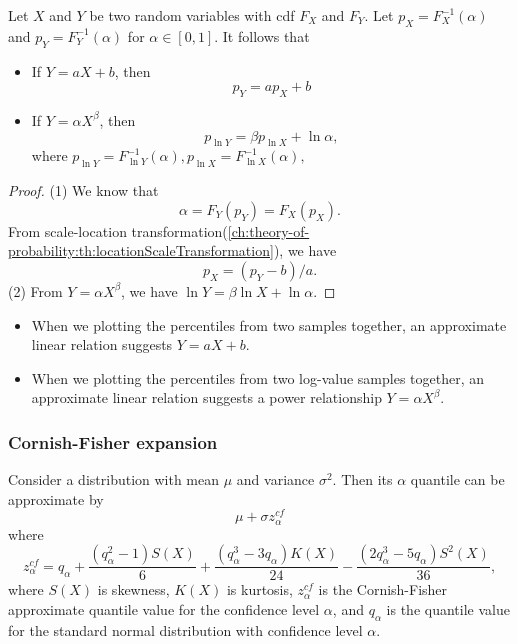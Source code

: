 \begin{refsection}
\begin{lemma}
Let $X$ and $Y$ be two random variables with cdf $F_X$ and $F_Y$. Let $p_X = F_X^{-1}(\alpha)$ and $p_Y = F_Y^{-1}(\alpha)$ for $\alpha\in [0,1]$. It follows that
\begin{itemize}
	\item If $Y = aX + b$, then 
	$$p_Y = ap_X + b$$
	\item If $Y = \alpha X^\beta$, then
	$$p_{\ln Y} = \beta p_{\ln X} + \ln \alpha,$$
	where $p_{\ln Y} = F^{-1}_{\ln Y}(\alpha),p_{\ln X} = F^{-1}_{\ln X}(\alpha),$
\end{itemize}
\end{lemma}
\begin{proof}
(1)	We know that
$$\alpha = F_Y(p_Y) = F_X(p_X).$$
From scale-location transformation(\autoref{ch:theory-of-probability:th:locationScaleTransformation}), we have 
$$p_X = (p_Y-b)/a.$$
(2) From $Y = \alpha X^\beta$, we have $\ln Y = \beta\ln X + \ln \alpha.$
\end{proof}

\begin{remark} \hfill
\begin{itemize}
	\item When we plotting the percentiles from two samples together, an approximate linear relation suggests $Y = aX + b$.
	\item When we plotting the percentiles from two log-value samples  together, an approximate linear relation suggests a power relationship $Y = \alpha X^\beta$.
\end{itemize}	
	
\end{remark}


\subsubsection{Cornish-Fisher expansion}



\begin{theorem}\label{ch:theory-of-statistics:th:CornishFisherExpansion}
Consider a distribution with mean $\mu$ and variance $\sigma^2$. Then its $\alpha$ quantile can be approximate by
$$\mu + \sigma z^{cf}_\alpha$$
where	
	$$z^{cf}_\alpha = q_\alpha + \frac{(q_\alpha^2 - 1)S(X)}{6} + \frac{(q_\alpha^3 - 3q_\alpha)K(X)}{24} - \frac{(2q_\alpha^3 - 5q_\alpha)S^2(X)}{36},$$
where $S(X)$ is skewness, $K(X)$ is kurtosis, $z^{cf}_\alpha$ is the Cornish-Fisher approximate quantile value for the confidence level $\alpha$,	and $q_\alpha$ is the quantile value for the standard normal distribution with confidence level $\alpha$.
\end{theorem}


\end{refsection}
